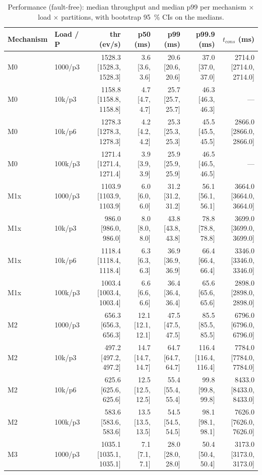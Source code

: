
\begin{table}[htbp]
\centering
\small
\caption{Performance (fault-free): median throughput and median p99 per mechanism × load × partitions, with bootstrap 95~\% CIs on the medians.}
\label{tab:performance}
\begin{tabular}{llrrrrr}
\toprule
\textbf{Mechanism} & \textbf{Load / P} & \textbf{thr (ev/s)} & \textbf{p50 (ms)} & \textbf{p99 (ms)} & \textbf{p99.9 (ms)} & \textbf{$t_{cons}$ (ms)} \\
\midrule
M0 & 1000/p3 & 1528.3 [1528.3, 1528.3] & 3.6 [3.6, 3.6] & 20.6 [20.6, 20.6] & 37.0 [37.0, 37.0] & 2714.0 [2714.0, 2714.0] \\
M0 & 10k/p3 & 1158.8 [1158.8, 1158.8] & 4.7 [4.7, 4.7] & 25.7 [25.7, 25.7] & 46.3 [46.3, 46.3] & — \\
M0 & 10k/p6 & 1278.3 [1278.3, 1278.3] & 4.2 [4.2, 4.2] & 25.3 [25.3, 25.3] & 45.5 [45.5, 45.5] & 2866.0 [2866.0, 2866.0] \\
M0 & 100k/p3 & 1271.4 [1271.4, 1271.4] & 3.9 [3.9, 3.9] & 25.9 [25.9, 25.9] & 46.5 [46.5, 46.5] & — \\
M1x & 1000/p3 & 1103.9 [1103.9, 1103.9] & 6.0 [6.0, 6.0] & 31.2 [31.2, 31.2] & 56.1 [56.1, 56.1] & 3664.0 [3664.0, 3664.0] \\
M1x & 10k/p3 & 986.0 [986.0, 986.0] & 8.0 [8.0, 8.0] & 43.8 [43.8, 43.8] & 78.8 [78.8, 78.8] & 3699.0 [3699.0, 3699.0] \\
M1x & 10k/p6 & 1118.4 [1118.4, 1118.4] & 6.3 [6.3, 6.3] & 36.9 [36.9, 36.9] & 66.4 [66.4, 66.4] & 3346.0 [3346.0, 3346.0] \\
M1x & 100k/p3 & 1003.4 [1003.4, 1003.4] & 6.6 [6.6, 6.6] & 36.4 [36.4, 36.4] & 65.6 [65.6, 65.6] & 2898.0 [2898.0, 2898.0] \\
M2 & 1000/p3 & 656.3 [656.3, 656.3] & 12.1 [12.1, 12.1] & 47.5 [47.5, 47.5] & 85.5 [85.5, 85.5] & 6796.0 [6796.0, 6796.0] \\
M2 & 10k/p3 & 497.2 [497.2, 497.2] & 14.7 [14.7, 14.7] & 64.7 [64.7, 64.7] & 116.4 [116.4, 116.4] & 7784.0 [7784.0, 7784.0] \\
M2 & 10k/p6 & 625.6 [625.6, 625.6] & 12.5 [12.5, 12.5] & 55.4 [55.4, 55.4] & 99.8 [99.8, 99.8] & 8433.0 [8433.0, 8433.0] \\
M2 & 100k/p3 & 583.6 [583.6, 583.6] & 13.5 [13.5, 13.5] & 54.5 [54.5, 54.5] & 98.1 [98.1, 98.1] & 7626.0 [7626.0, 7626.0] \\
M3 & 1000/p3 & 1035.1 [1035.1, 1035.1] & 7.1 [7.1, 7.1] & 28.0 [28.0, 28.0] & 50.4 [50.4, 50.4] & 3173.0 [3173.0, 3173.0] \\

\end{tabular}
\end{table}
